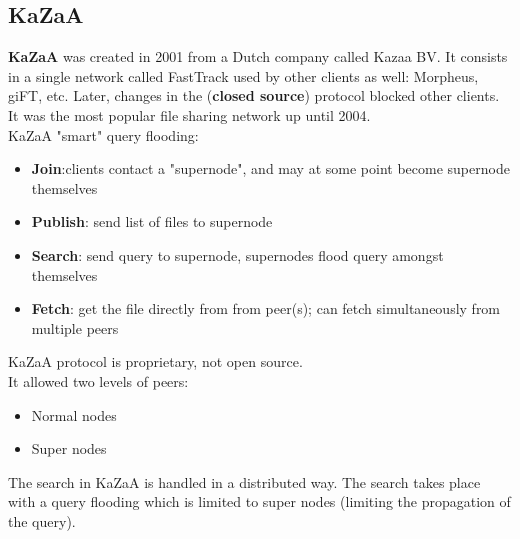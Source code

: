 \documentclass[10pt,a4paper]{article}
\begin{document}
\subsection{KaZaA}
\textbf{KaZaA} was created in 2001 from a Dutch company called Kazaa BV. It consists in a single network called FastTrack used by other clients as well: Morpheus, giFT, etc. Later, changes in the (\textbf{closed source}) protocol blocked other clients. \\
It was the most popular file sharing network up until 2004. \\
KaZaA "smart" query flooding:
\begin{itemize}
	\item \textbf{Join}:clients contact a "supernode", and may at some point become supernode themselves
	\item \textbf{Publish}: send list of files to supernode
	\item \textbf{Search}: send query to supernode, supernodes flood query amongst themselves
	\item \textbf{Fetch}: get the file directly from from peer(s); can fetch simultaneously from multiple peers
\end{itemize}
KaZaA protocol is proprietary, not open source. \\ It allowed two levels of peers:
\begin{itemize}
	\item Normal nodes
	\item Super nodes
\end{itemize}
The search in KaZaA is handled in a distributed way. The search takes place with a query flooding which is limited to super nodes (limiting the propagation of the query).
\end{document}
